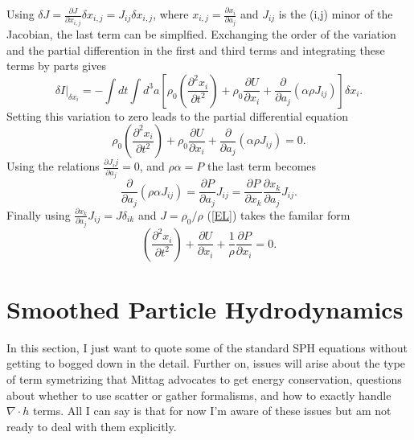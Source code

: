 Using $\delta J = \frac{\partial J}{\partial x_{i,j}} \delta x_{i,j} = J_{ij} \delta x_{i,j}$, where $x_{i,j} = \frac{\partial x_i}{\partial a_j}$ and $J_{ij}$ is the (i,j) minor of the Jacobian, the last term can be simplfied.  Exchanging the order of the variation and the partial differention in the first and third terms and integrating these terms by parts gives
\begin{equation}
\delta I \vert_{\delta x_i} = -\int dt \int d^3a \left[ \rho_0 \left(\frac{\partial^2 x_i}{\partial t^2}\right) + \rho_0 \frac{\partial U}{\partial x_i} + \frac{\partial}{\partial a_j}\left(\alpha \rho J_{ij}\right) \right] \delta x_i.
\end{equation}
Setting this variation to zero leads to the partial differential equation
\begin{equation}\label{EL}
\rho_0 \left(\frac{\partial^2 x_i}{\partial t^2}\right) + \rho_0 \frac{\partial U}{\partial x_i} + \frac{\partial}{\partial a_j}\left(\alpha \rho J_{ij}\right) = 0.
\end{equation}
Using the relations $\frac{\partial J_ij}{\partial a_j} = 0$, and $\rho \alpha = P$ the last term becomes
\begin{equation}
\frac{\partial}{\partial a_j}\left( \rho \alpha J_{ij} \right) = \frac{\partial P}{\partial a_j} J_{ij} = \frac{\partial P}{\partial x_k}\frac{\partial x_k}{\partial a_j} J_{ij}.
\end{equation}
Finally using $\frac{\partial x_k}{\partial a_j} J_{ij} = J \delta_{ik}$ and $J = \rho_0 / \rho$ (\ref{EL}) takes the familar form
\begin{equation}
\left(\frac{\partial^2 x_i}{\partial t^2}\right) + \frac{\partial U}{\partial x_i} + \frac{1}{\rho} \frac{\partial P}{\partial x_i} = 0.
\end{equation}



\section{Smoothed Particle Hydrodynamics}\label{sph}
In this section, I just want to quote some of the standard SPH equations without getting to bogged down in the detail.  Further on, issues will arise about the type of term symetrizing that Mittag advocates to get energy conservation, questions about whether to use scatter or gather formalisms, and how to exactly handle $\nabla \cdot h$ terms.  All I can say is that for now I'm aware of these issues but am not ready to deal with them explicitly.

